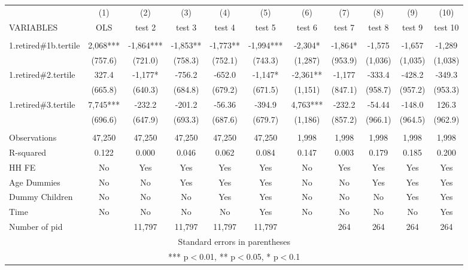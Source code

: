 \begin{tabular}{lcccccccccc} \hline
 & (1) & (2) & (3) & (4) & (5) & (6) & (7) & (8) & (9) & (10) \\
VARIABLES & OLS & test 2 & test 3 & test 4 & test 5 & test 6 & test 7 & test 8 & test 9 & test 10 \\ \hline
 &  &  &  &  &  &  &  &  &  &  \\
1.retired\#1b.tertile & 2,068*** & -1,864*** & -1,853** & -1,773** & -1,994*** & -2,304* & -1,864* & -1,575 & -1,657 & -1,289 \\
 & (757.6) & (721.0) & (758.3) & (752.1) & (743.3) & (1,287) & (953.9) & (1,036) & (1,035) & (1,038) \\
1.retired\#2.tertile & 327.4 & -1,177* & -756.2 & -652.0 & -1,147* & -2,361** & -1,177 & -333.4 & -428.2 & -349.3 \\
 & (665.8) & (640.3) & (684.8) & (679.2) & (671.5) & (1,151) & (847.1) & (958.7) & (957.2) & (953.3) \\
1.retired\#3.tertile & 7,745*** & -232.2 & -201.2 & -56.36 & -394.9 & 4,763*** & -232.2 & -54.44 & -148.0 & 126.3 \\
 & (696.6) & (647.9) & (693.3) & (687.6) & (679.7) & (1,186) & (857.2) & (966.1) & (964.5) & (962.9) \\
 &  &  &  &  &  &  &  &  &  &  \\
Observations & 47,250 & 47,250 & 47,250 & 47,250 & 47,250 & 1,998 & 1,998 & 1,998 & 1,998 & 1,998 \\
R-squared & 0.122 & 0.000 & 0.046 & 0.062 & 0.084 & 0.147 & 0.003 & 0.179 & 0.185 & 0.200 \\
HH FE & No & Yes & Yes & Yes & Yes & No & Yes & Yes & Yes & Yes \\
Age Dummies & No & No & Yes & Yes & Yes & No & No & Yes & Yes & Yes \\
Dummy Children & No & No & No & Yes & Yes & No & No & No & Yes & Yes \\
Time & No & No & No & No & Yes & No & No & No & No & Yes \\
 Number of pid &  & 11,797 & 11,797 & 11,797 & 11,797 &  & 264 & 264 & 264 & 264 \\ \hline
\multicolumn{11}{c}{ Standard errors in parentheses} \\
\multicolumn{11}{c}{ *** p$<$0.01, ** p$<$0.05, * p$<$0.1} \\
\end{tabular}
